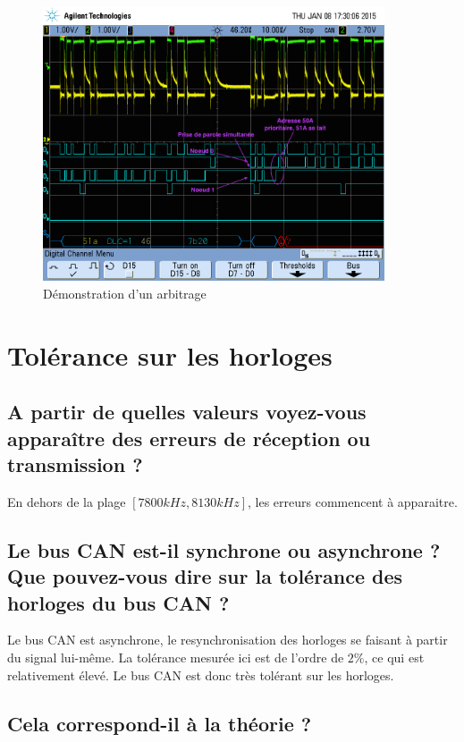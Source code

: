 \documentclass[12pt]{article}
\begin{document}
\begin{figure}[H]
\centering
\includegraphics[width=0.9\textwidth]{releve_2.png}
\caption{Démonstration d'un arbitrage}
\end{figure}

\section{Tolérance sur les horloges}

\subsection{A partir de quelles valeurs voyez-vous apparaître des erreurs de réception ou transmission ?}

En dehors de la plage $[7800kHz, 8130kHz]$, les erreurs commencent à apparaitre.

\subsection{Le bus CAN est-il synchrone ou asynchrone ? Que pouvez-vous dire sur la tolérance des horloges du bus CAN ?}

Le bus CAN est asynchrone, le resynchronisation des horloges se faisant à partir du signal lui-même. La tolérance mesurée ici est de l'ordre de $2\%$, ce qui est relativement élevé. Le bus CAN est donc très tolérant sur les horloges.

\subsection{Cela correspond-il à la théorie ?}
\end{document}
